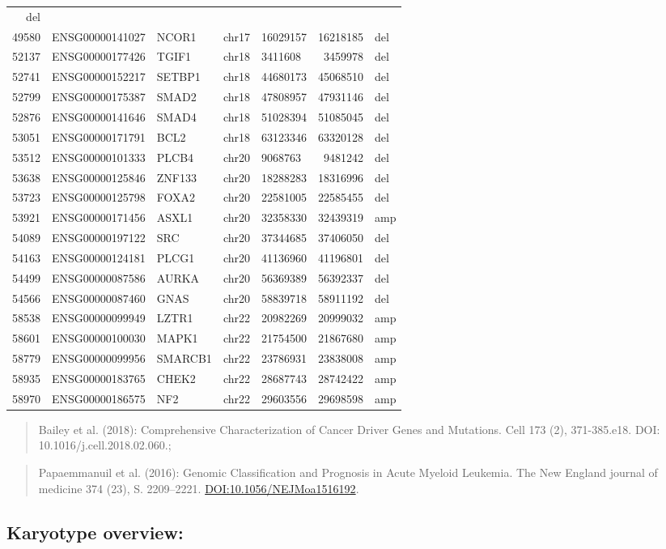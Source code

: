 \documentclass[]{article}
\begin{document}
\begin{longtable}[]{@{}rrlrlrl@{}}
del\tabularnewline
49580 & ENSG00000141027 & NCOR1 & chr17 & 16029157 & 16218185 &
del\tabularnewline
52137 & ENSG00000177426 & TGIF1 & chr18 & 3411608 & 3459978 &
del\tabularnewline
52741 & ENSG00000152217 & SETBP1 & chr18 & 44680173 & 45068510 &
del\tabularnewline
52799 & ENSG00000175387 & SMAD2 & chr18 & 47808957 & 47931146 &
del\tabularnewline
52876 & ENSG00000141646 & SMAD4 & chr18 & 51028394 & 51085045 &
del\tabularnewline
53051 & ENSG00000171791 & BCL2 & chr18 & 63123346 & 63320128 &
del\tabularnewline
53512 & ENSG00000101333 & PLCB4 & chr20 & 9068763 & 9481242 &
del\tabularnewline
53638 & ENSG00000125846 & ZNF133 & chr20 & 18288283 & 18316996 &
del\tabularnewline
53723 & ENSG00000125798 & FOXA2 & chr20 & 22581005 & 22585455 &
del\tabularnewline
53921 & ENSG00000171456 & ASXL1 & chr20 & 32358330 & 32439319 &
amp\tabularnewline
54089 & ENSG00000197122 & SRC & chr20 & 37344685 & 37406050 &
del\tabularnewline
54163 & ENSG00000124181 & PLCG1 & chr20 & 41136960 & 41196801 &
del\tabularnewline
54499 & ENSG00000087586 & AURKA & chr20 & 56369389 & 56392337 &
del\tabularnewline
54566 & ENSG00000087460 & GNAS & chr20 & 58839718 & 58911192 &
del\tabularnewline
58538 & ENSG00000099949 & LZTR1 & chr22 & 20982269 & 20999032 &
amp\tabularnewline
58601 & ENSG00000100030 & MAPK1 & chr22 & 21754500 & 21867680 &
amp\tabularnewline
58779 & ENSG00000099956 & SMARCB1 & chr22 & 23786931 & 23838008 &
amp\tabularnewline
58935 & ENSG00000183765 & CHEK2 & chr22 & 28687743 & 28742422 &
amp\tabularnewline
58970 & ENSG00000186575 & NF2 & chr22 & 29603556 & 29698598 &
amp\tabularnewline
\bottomrule
\end{longtable}

\begin{quote}
Bailey et al. (2018): Comprehensive Characterization of Cancer Driver
Genes and Mutations. Cell 173 (2), 371-385.e18. DOI:
10.1016/j.cell.2018.02.060.;
\end{quote}

\begin{quote}
Papaemmanuil et al. (2016): Genomic Classification and Prognosis in
Acute Myeloid Leukemia. The New England journal of medicine 374 (23), S.
2209--2221. \url{DOI:10.1056/NEJMoa1516192}.
\end{quote}

\hypertarget{karyotype-overview}{%
\subsection{Karyotype overview:}\label{karyotype-overview}}
\end{document}

